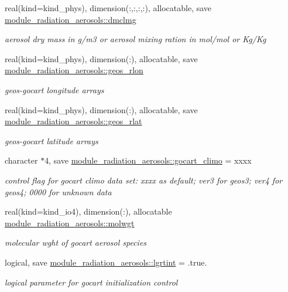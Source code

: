 \begin{DoxyCompactItemize}
real(kind=kind\+\_\+phys), dimension(\+:,\+:,\+:,\+:), allocatable, save \hyperlink{group__module__radiation__aerosols_ga123d552c7f98f7371565f4e2017efd45}{module\+\_\+radiation\+\_\+aerosols\+::dmclmg}
\begin{DoxyCompactList}\small\item\em aerosol dry mass in g/m3 or aerosol mixing ration in mol/mol or Kg/\+Kg \end{DoxyCompactList}\item 
real(kind=kind\+\_\+phys), dimension(\+:), allocatable, save \hyperlink{group__module__radiation__aerosols_ga1a0e35ab33517e765898870b8b1ab1ad}{module\+\_\+radiation\+\_\+aerosols\+::geos\+\_\+rlon}
\begin{DoxyCompactList}\small\item\em geos-\/gocart longitude arrays \end{DoxyCompactList}\item 
real(kind=kind\+\_\+phys), dimension(\+:), allocatable, save \hyperlink{group__module__radiation__aerosols_gaef43bfbd28ef9b87e8d6973ba7331a18}{module\+\_\+radiation\+\_\+aerosols\+::geos\+\_\+rlat}
\begin{DoxyCompactList}\small\item\em geos-\/gocart latitude arrays \end{DoxyCompactList}\item 
character $\ast$4, save \hyperlink{group__module__radiation__aerosols_gab8118108e60a4795a8caa5af71232399}{module\+\_\+radiation\+\_\+aerosols\+::gocart\+\_\+climo} = \textquotesingle{}xxxx\textquotesingle{}
\begin{DoxyCompactList}\small\item\em control flag for gocart climo data set\+: xxxx as default; ver3 for geos3; ver4 for geos4; 0000 for unknown data \end{DoxyCompactList}\item 
real(kind=kind\+\_\+io4), dimension(\+:), allocatable \hyperlink{group__module__radiation__aerosols_ga166e63abaa518ec795f8eea6d115f03c}{module\+\_\+radiation\+\_\+aerosols\+::molwgt}
\begin{DoxyCompactList}\small\item\em molecular wght of gocart aerosol species \end{DoxyCompactList}\item 
logical, save \hyperlink{group__module__radiation__aerosols_gaa27bf6912bfd67b78381892d4f555c51}{module\+\_\+radiation\+\_\+aerosols\+::lgrtint} = .true.
\begin{DoxyCompactList}\small\item\em logical parameter for gocart initialization control \end{DoxyCompactList}\item 

\end{DoxyCompactItemize}
